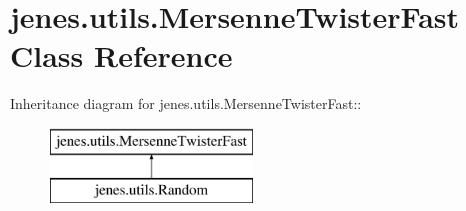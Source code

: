 \hypertarget{classjenes_1_1utils_1_1_mersenne_twister_fast}{
\section{jenes.utils.MersenneTwisterFast Class Reference}
\label{classjenes_1_1utils_1_1_mersenne_twister_fast}
}
Inheritance diagram for jenes.utils.MersenneTwisterFast::\begin{figure}[H]
\begin{center}
\leavevmode
\includegraphics[height=2cm]{classjenes_1_1utils_1_1_mersenne_twister_fast}
\end{center}
\end{figure}
